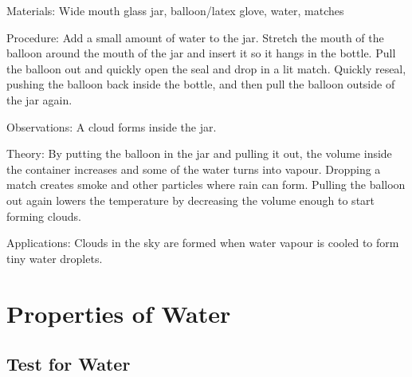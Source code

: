 \begin{multicols}{2}

\begin{description*}
\item[Materials:]{Wide mouth glass jar, balloon/latex glove, water, matches}
\item[Procedure:]{Add a small amount of water to the jar. Stretch the mouth of the balloon around the mouth of the jar and insert it so it hangs in the bottle. Pull the balloon out and quickly open the seal and drop in a lit match. Quickly reseal, pushing the balloon back inside the bottle, and then pull the balloon outside of the jar again.}
\item[Observations:]{A cloud forms inside the jar.}
\item[Theory:]{By putting the balloon in the jar and pulling it out, the volume inside the container increases and some of the water turns into vapour. Dropping a match creates smoke and other particles where rain can form. Pulling the balloon out again lowers the temperature by decreasing the volume enough to start forming clouds.}
\item[Applications:]{Clouds in the sky are formed when water vapour is cooled to form tiny water droplets.}
\end{description*}


\section*{Properties of Water}


\subsection{Test for Water} %



\end{multicols}
